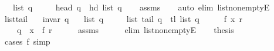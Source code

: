 \begin{isabellebody}
\ \ \ {\isachardoublequoteopen}list\ q\ {\isasymnoteq}\ {\isacharbrackleft}{\kern0pt}{\isacharbrackright}{\kern0pt}{\isachardoublequoteclose}\isanewline
\ \ \ {\isachardoublequoteopen}head\ q\ {\isacharequal}{\kern0pt}\ hd\ {\isacharparenleft}{\kern0pt}list\ q{\isacharparenright}{\kern0pt}{\isachardoublequoteclose}%
\endisataginvisible
{\isafoldinvisible}%
%
\isadeliminvisible
\isanewline
%
\endisadeliminvisible
%
\isadelimproof
\ \ %
\endisadelimproof
%
\isatagproof
{}\isamarkupfalse%
\ assms\isanewline
\ \ \isamarkupfalse%
\ {\isacharparenleft}{\kern0pt}auto\ elim{\isacharcolon}{\kern0pt}\ list{\isacharunderscore}{\kern0pt}non{\isacharunderscore}{\kern0pt}emptyE{\isacharparenright}{\kern0pt}%
\endisatagproof
{\isafoldproof}%
%
\isadelimproof
\isanewline
%
\endisadelimproof
%
\isadeliminvisible
\isanewline
%
\endisadeliminvisible
%
\isataginvisible
{}\isamarkupfalse%
\ list{\isacharunderscore}{\kern0pt}tail{\isacharcolon}{\kern0pt}\isanewline
\ \ \ {\isachardoublequoteopen}invar\ q{\isachardoublequoteclose}\isanewline
\ \ \ {\isachardoublequoteopen}list\ q\ {\isasymnoteq}\ {\isacharbrackleft}{\kern0pt}{\isacharbrackright}{\kern0pt}{\isachardoublequoteclose}\isanewline
\ \ \ {\isachardoublequoteopen}list\ {\isacharparenleft}{\kern0pt}tail\ q{\isacharparenright}{\kern0pt}\ {\isacharequal}{\kern0pt}\ tl\ {\isacharparenleft}{\kern0pt}list\ q{\isacharparenright}{\kern0pt}{\isachardoublequoteclose}%
\endisataginvisible
{\isafoldinvisible}%
%
\isadeliminvisible
\isanewline
%
\endisadeliminvisible
%
\isadelimproof
%
\endisadelimproof
%
\isatagproof
{}\isamarkupfalse%
\ {\isacharminus}{\kern0pt}\isanewline
\ \ \isamarkupfalse%
\ f\ x\ r\ \isanewline
\ \ \ \ {\isachardoublequoteopen}q\ {\isacharequal}{\kern0pt}\ {\isacharparenleft}{\kern0pt}x\ {\isacharhash}{\kern0pt}\ f{\isacharcomma}{\kern0pt}\ r{\isacharparenright}{\kern0pt}{\isachardoublequoteclose}\isanewline
\ \ \ \ \isamarkupfalse%
\ assms\isanewline
\ \ \ \ \isamarkupfalse%
\ {\isacharparenleft}{\kern0pt}elim\ list{\isacharunderscore}{\kern0pt}non{\isacharunderscore}{\kern0pt}emptyE{\isacharparenright}{\kern0pt}\isanewline
\ \ \isamarkupfalse%
\ {\isacharquery}{\kern0pt}thesis\isanewline
\ \ \ \ \isamarkupfalse%
\ {\isacharparenleft}{\kern0pt}cases\ f{\isacharparenright}{\kern0pt}\ simp{\isacharplus}{\kern0pt}\isanewline
{}\isamarkupfalse%

\end{isabellebody}
